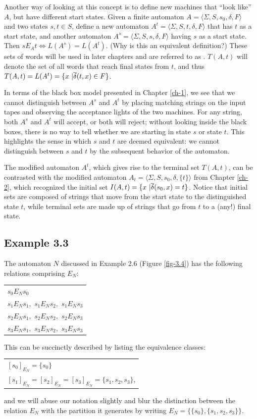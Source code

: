 Another way of looking at this concept is to define new machines that ``look
like'' $A$, but have different start states. Given a finite automaton
$A =\langle\Sigma,S,s_0,\delta,F\rangle$ and two states $s,t \in S$, define a new
automaton $A^t =\langle\Sigma,S,t,\delta,F\rangle$ that has $t$ as a start state, and
another automaton $A^s =\langle\Sigma,S,s,\delta,F\rangle$ having $s$ as a start state.
Then $s E_A t \Leftrightarrow L(A^s) = L(A^t)$. (Why is this an equivalent
definition?) These sets of words will be used in later chapters and are referred
to as \emph{}. $T(A,t)$ will denote the set of all words
that reach final states from $t$, and thus
$T(A,t) = L(A^t) = \{x\ |\overline{\delta}(t,x) \in F\}$.

In terms of the black box model presented in Chapter \ref{ch-1}, we see that we cannot
distinguish between $A^s$ and $A^t$ by placing matching strings on the input
tapes and observing the acceptance lights of the two machines. For any string,
both $A^s$ and $A^t$ will accept, or both will reject; without looking inside
the black boxes, there is no way to tell whether we are starting in state $s$ or
state $t$. This highlights the sense in which $s$ and $t$ are deemed equivalent:
we cannot distinguish between $s$ and $t$ by the subsequent behavior of the
automaton.

The modified automaton $A^t$, which gives rise to the terminal set $T(A,t)$, can
be contrasted with the modified automaton $A_t=\langle\Sigma,S,s_0,\delta,\{t\}\rangle$
from Chapter \ref{ch-2}, which recognized the initial set
$I(A,t) = \{x\ | \overline{\delta}(s_0,x) = t\}$. Notice that initial sets are composed of
strings that move from the start state to the distinguished state $t$, while
terminal sets are made up of strings that go from $t$ to a (any!) final state.

\subsection*{Example 3.3}

The automaton $N$ discussed in Example 2.6 (Figure \ref{fig-3.4}) has the following
relations comprising $E_N$:
\begin{center}
\begin{tabular}{l}
$s_0 E_N s_0$ \\
$s_1 E_N s_1,$ $s_1 E_N s_2,$ $s_1 E_N s_3$\\
$s_2 E_N s_1,$ $s_2 E_N s_2,$ $s_2 E_N s_3$\\
$s_3 E_N s_1,$ $s_3 E_N s_2,$ $s_3 E_N s_3$
\end{tabular}
\end{center}
This can be succinctly described by listing the equivalence classes:
\begin{center}
\begin{tabular}{l}
$[s_0]_{E_N} = \{s_0\}$ \\
$[s_1]_{E_N} = [s_2]_{E_N} = [s_3]_{E_N} = \{s_1, s_2, s_3\}$,
\end{tabular}
\end{center}
and we will abuse our notation slightly and blur the distinction
between the relation $E_N$ with the partition it generates by writing
$E_N = \{\{s_0\},\{s_1,s_2,s_3\}\}$.

